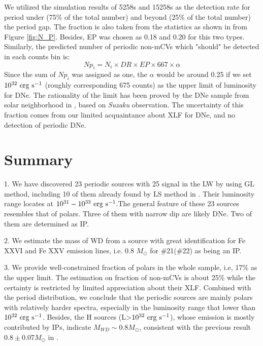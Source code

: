 \documentclass[fleqn,usenatbib]{mnras}
\begin{document}
We utilized the simulation results of 5258s and 15258s as the detection rate for period under (75\% of the total number) and beyond (25\% of the total number) the period gap. The fraction is also taken from the statistics as shown in from Figure \ref{fig:N_P}. Besides, EP was chosen as 0.18 and 0.20 for this two types.
Similarly, the predicted number of periodic non-mCVs which "should" be detected in each counts bin is:
\begin{equation}
Np_{i}=N_i\times DR \times EP \times 667 \times \alpha	
\end{equation}
Since the sum of $Np_{i}$ was assigned as one, the $\alpha$ would be around 0.25 if we set $\rm 10^{32}~erg~s^{-1}$ (roughly corresponding 675 counts) as the upper limit of luminosity for DNe. The rationality of the limit has been proved by the DNe sample from solar neighborhood in \citep{2016ApJ...818..136X}, based on {\it Suzaku} observation. The uncertainty of this fraction comes from our limited acquaintance about XLF for DNe, and no detection of periodic DNe. 


\section{Summary}\label{sec:summary}

1. We have discovered 23 periodic sources with 25 signal in the LW by using GL method, including 10 of them already found by LS method in \cite{2012ApJ...746..165H}. Their luminosity range locates at $\rm 10^{31}-10^{33}~erg~s^{-1} $.The general feature of these 23 sources resembles that of polars. Three of them with narrow dip are likely DNe. Two of them are determined as IP.

2.  We estimate the mass of WD from a source with great identification for Fe XXVI and Fe XXV emission lines, i.e. 0.8 $M_\odot$ for \#21(\#22) as being an IP. 

3. We provide well-constrained fraction of polars in the whole sample, i.e, 17\% as the upper limit. The estimation on fraction of non-mCVs is about 25\% while the certainty is restricted by limited appreciation about their XLF. Combined with the period distribution, we conclude that the periodic sources are mainly polars with relatively harder spectra, especially in the luminosity range that lower than $\rm 10^{32}~erg~s^{-1}$. Besides, the H sources (L>$\rm 10^{32}~erg~s^{-1}$), whose emission is mostly contributed by IPs, indicate  $M_{WD} \sim 0.8 M_\odot$, consistent with the previous result $0.8\pm 0.07 M_\odot$ in \citep{2018ApJ...853..182Y}.
\end{document}
